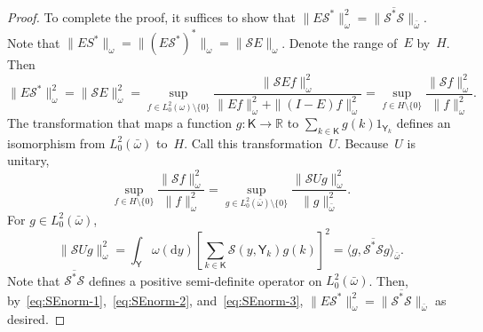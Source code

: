 \documentclass[12pt]{article}
\newcommand{\df}{\mathrm{d}}
\newcommand{\Y}{\mathsf{Y}}
\newcommand{\Mtk}{\mtkfont{T}}
\newcommand{\mtkfont}{\mathcal}
\begin{document}
\begin{proof}
	To complete the proof, it suffices to show that $\|E\mtkfont{S}^*\|_{\omega}^2 = \|\overline{\mtkfont{S}^* \mtkfont{S}}\|_{\bar{\omega}}$.
	Note that $\|ES^*\|_{\omega} = \|(E\mtkfont{S}^*)^*\|_{\omega} = \|\mtkfont{S}E\|_{\omega}$.
	Denote the range of~$E$ by~$H$.
	Then
	\begin{equation} \label{eq:SEnorm-1}
		\|E\mtkfont{S}^*\|_{\omega}^2 = \|\mtkfont{S}E\|_{\omega}^2 = \sup_{f \in L_0^2(\omega) \setminus \{0\}} \frac{\|\mtkfont{S}Ef\|_{\omega}^2}{\|Ef\|_{\omega}^2 + \|(I-E)f\|_{\omega}^2} =  \sup_{f \in H \setminus \{0\}} \frac{\|\mtkfont{S} f\|_{\omega}^2}{\|f\|_{\omega}^2}.
	\end{equation}
	The transformation that maps a function $g: \mathsf{K} \to \mathbb{R}$ to $\sum_{k \in \mathsf{K}} g(k) 1_{\Y_k}$
	defines an isomorphism from $L_0^2(\bar{\omega})$ to~$H$.
	Call this transformation~$U$.
	Because~$U$ is unitary,
	\begin{equation} \label{eq:SEnorm-2}
		\sup_{f \in H \setminus \{0\}} \frac{\|\mtkfont{S}f\|_{\omega}^2}{\|f\|_{\omega}^2} =  \sup_{g \in L_0^2(\bar{\omega})  \setminus \{0\}} \frac{\|\mtkfont{S} Ug\|_{\omega}^2}{\|g\|_{\bar{\omega}}^2}.
	\end{equation} 
	For $g \in L_0^2(\bar{\omega})$,
	\begin{equation} \label{eq:SEnorm-3}
		\|\mtkfont{S} Ug\|_{\omega}^2 = \int_{\Y} \omega(\df y) \left[ \sum_{k \in \mathsf{K}} \mtkfont{S}(y, \Y_k) g(k) \right]^2 = \langle g, \overline{\mtkfont{S}^*\mtkfont{S}} g \rangle_{\bar{\omega}}.
	\end{equation}
	Note that $\overline{\mtkfont{S}^* \mtkfont{S}}$ defines a positive semi-definite operator on $L_0^2(\bar{\omega})$.
	Then, by~\eqref{eq:SEnorm-1},~\eqref{eq:SEnorm-2}, and~\eqref{eq:SEnorm-3}, $\|E\mtkfont{S}^*\|_{\omega}^2 = \|\overline{\mtkfont{S}^* \mtkfont{S}}\|_{\bar{\omega}}$ as desired.
\end{proof}

\end{document}
